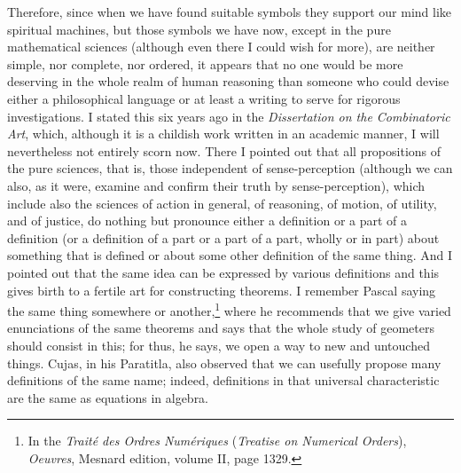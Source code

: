 \documentclass[twoside,openright]{article}
\begin{document}
Therefore, since when we have found suitable symbols they support our mind
like spiritual machines, but those symbols we have now, except in the pure
mathematical sciences (although even there I could wish for more), are neither
simple, nor complete, nor ordered, it appears that no one would be more
deserving in the whole realm of human reasoning than someone who could devise
either a philosophical language or at least a writing to serve for rigorous
investigations.  I stated this six years ago in the {\em Dissertation on the
Combinatoric Art}, which, although it is a childish work written in an
academic manner, I will nevertheless not entirely scorn now.  There I pointed
out that all propositions of the pure sciences, that is, those independent of
sense-perception (although we can also, as it were, examine and confirm their
truth by sense-perception), which include also the sciences of action in
general, of reasoning, of motion, of utility, and of justice, do nothing but
pronounce either a definition or a part of a definition (or a definition of a
part or a part of a part, wholly or in part) about something that is defined
or about some other definition of the same thing. And I pointed out that the
same idea can be expressed by various definitions and this gives birth to a
fertile art for constructing theorems.  I remember Pascal saying the same
thing somewhere or another,\footnote{In the {\em Trait\'{e} des Ordres Num\'{e}riques} ({\em Treatise on Numerical Orders}), {\em Oeuvres}, Mesnard edition, volume II, page 1329.}  where he recommends that we give varied
enunciations of the same theorems and says that the whole study of geometers
should consist in this; for thus, he says, we open a way to new and untouched
things.  Cujas, in his Paratitla, also observed that we can usefully propose
many definitions of the same name; indeed, definitions in that universal
characteristic are the same as equations in algebra.
\end{document}
